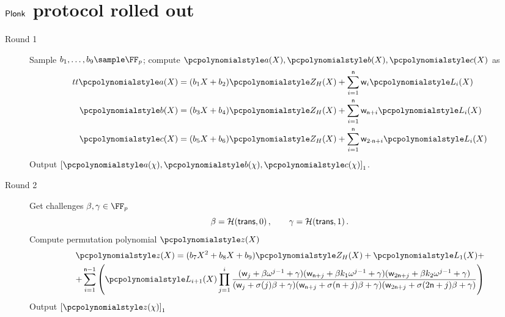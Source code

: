 \let\accentvec\vec \documentclass[runningheads,10pt]{llncs}
\begin{document}
\section{$\textnormal{\textsf{Plonk}}$ protocol rolled out}
\label{sec:plonk_explained}
\begin{description}
	\item[Round 1] 
	Sample $b_1, \ldots, b_9 \sample \FF_p$; compute $\p{a}(X), \p{b}(X), \p{c}(X)$ as 
	\begin{align*}t t
		\p{a}(X) &= (b_1 X + b_2)\p{Z_H}(X) + \sum_{i = 1}^{\numberofconstrains} \wit_i \lag_i(X) \\
		\p{b}(X) &= (b_3 X + b_4)\p{Z_H}(X) + \sum_{i = 1}^{\numberofconstrains} \wit_{\numberofconstrains + i} \lag_i(X) \\
		\p{c}(X) &= (b_5 X + b_6)\p{Z_H}(X) + \sum_{i = 1}^{\numberofconstrains} \wit_{2 \cdot \numberofconstrains + i} \lag_i(X) 
	\end{align*}
	Output $\gone{\p{a}(\chi), \p{b}(\chi), \p{c}(\chi)}$.
	
	\item[Round 2]
	Get challenges $\beta, \gamma \in \FF_p$
	\[
		\beta = \mathcal{H}(\mathsf{trans}, 0)\,, \qquad \gamma = \mathcal{H}(\mathsf{trans}, 1)\,.
	\]
	Compute permutation polynomial $\p{z}(X)$
	\begin{multline*}
		\p{z}(X) = (b_7 X^2 + b_8 X + b_9)\p{Z_H}(X) + \lag_1(X) + \\
			+ \sum_{i = 1}^{\numberofconstrains - 1} 
			\left(\lag_{i + 1} (X) \prod_{j = 1}^{i} 
			\frac{
			(\wit_j +\beta \omega^{j - 1} + \gamma)(\wit_{\numberofconstrains + j} + \beta k_1 \omega^{j - 1} + \gamma)(\wit_{2 \numberofconstrains + j} +\beta k_2 \omega^{j- 1} + \gamma)}
			{(\wit_j+\sigma(j) \beta + \gamma)(\wit_{\numberofconstrains + j} + \sigma(\numberofconstrains + j)\beta + \gamma)(\wit_{2 \numberofconstrains + j} + \sigma(2 \numberofconstrains + j)\beta + \gamma)}\right)
	\end{multline*}
	Output $\gone{\p{z}(\chi)}$
		

\end{description}
\end{document}
